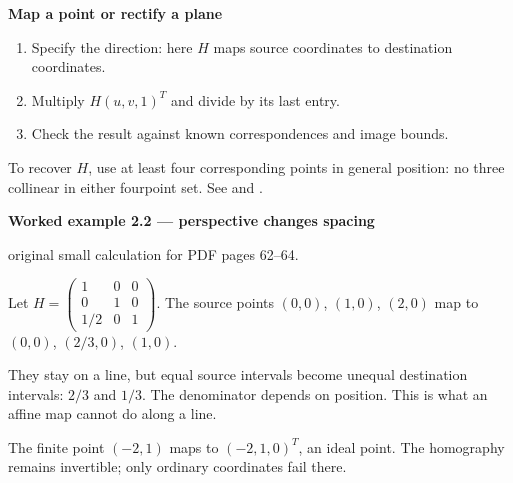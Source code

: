 \documentclass[letterpaper,11pt,english,openany,oneside]{jupyterBook}
\begin{document}
\begin{TextbookBox}
\textbf{Map a point or rectify a plane}\par\smallskip
\begin{enumerate}
%
\item {}
\sphinxAtStartPar
Specify the direction: here \(H\) maps source coordinates to destination coordinates.

\item {}
\sphinxAtStartPar
Multiply \(H(u,v,1)^T\) and divide by its last entry.

\item {}
\sphinxAtStartPar
Check the result against known correspondences and image bounds.

\end{enumerate}

\sphinxAtStartPar
To recover \(H\), use at least four corresponding points in general position: no three collinear in either four\sphinxhyphen{}point set. See {\hyperref[\detokenize{lectures/lecture02/estimation:lec02-estimation}]{}} and {\hyperref[\detokenize{lectures/lecture02/warping:lec02-warping}]{}}.

\end{TextbookBox}
\label{\detokenize{lectures/lecture02/homographies:ex-lec02-homography}}
\begin{TextbookBox}
\textbf{Worked example 2.2 — perspective changes spacing}\par\smallskip

\sphinxAtStartPar
{} original small calculation for PDF pages 62–64.

\sphinxAtStartPar
Let \(H=\begin{pmatrix}1&0&0\\0&1&0\\1/2&0&1\end{pmatrix}\). The source points \((0,0)\), \((1,0)\), \((2,0)\) map to \((0,0)\), \((2/3,0)\), \((1,0)\).

\sphinxAtStartPar
They stay on a line, but equal source intervals become unequal destination intervals: \(2/3\) and \(1/3\). The denominator depends on position. This is what an affine map cannot do along a line.

\sphinxAtStartPar
The finite point \((-2,1)\) maps to \((-2,1,0)^T\), an ideal point. The homography remains invertible; only ordinary coordinates fail there.

\end{TextbookBox}
\end{document}
